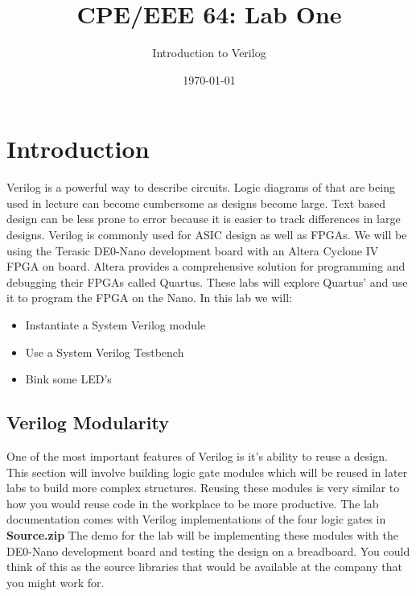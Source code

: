 \documentclass[12pt,journal]{IEEEtran}
\begin{document}
  \title{CPE/EEE 64: Lab One}
  \author{Introduction to Verilog}
  \date{\today}
  \maketitle

  \section{\bfseries Introduction}
    Verilog is a powerful way to describe circuits. Logic diagrams of that are being used in lecture 
    can become cumbersome as designs become large. Text based design can be less prone to error because 
    it is easier to track differences in large designs. Verilog is commonly used for ASIC design as well 
    as FPGAs. We will be using the Terasic DE0-Nano development board with an Altera Cyclone IV FPGA on 
    board. Altera provides a comprehensive solution for programming and debugging their FPGAs called Quartus. 
    These labs will explore Quartus' and use it to program the FPGA on the Nano. In this lab we will:
    \begin{itemize}
      \item Instantiate a System Verilog module
      \item Use a System Verilog Testbench
      \item Bink some LED's
    \end{itemize}
  
  \subsection{Verilog Modularity}
    One of the most important features of Verilog is it's ability to reuse a design. This section will 
    involve building logic gate modules which will be reused in later labs to build more complex
    structures. Reusing these modules is very similar to how you would reuse code in the workplace to be
    more productive. The lab documentation comes with Verilog implementations of the four logic gates in 
    {\bfseries Source.zip} The demo for the lab will be implementing these modules with the DE0-Nano development
    board and testing the design on a breadboard. You could think of this as the source libraries that would
    be available at the company that you might work for. 
\end{document}

